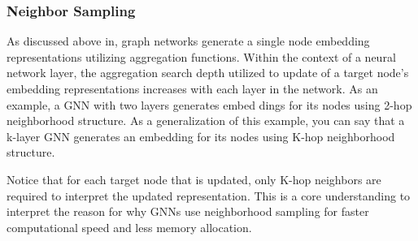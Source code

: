 \subsubsection{Neighbor Sampling}
As discussed above in, graph networks generate a single node embedding representations utilizing aggregation functions. Within the context of a neural network layer, the aggregation search depth utilized to update of a target node's embedding representations increases with each layer in the network. As an example, a GNN with two layers generates embed dings for its nodes using 2-hop neighborhood structure. As a generalization of this example, you can say that a k-layer GNN generates an embedding for its nodes using K-hop neighborhood structure.


Notice that for each target node that is updated, only K-hop neighbors are required to interpret the updated representation. This is a core understanding to interpret the reason for why GNNs use neighborhood sampling for faster computational speed and less memory allocation.